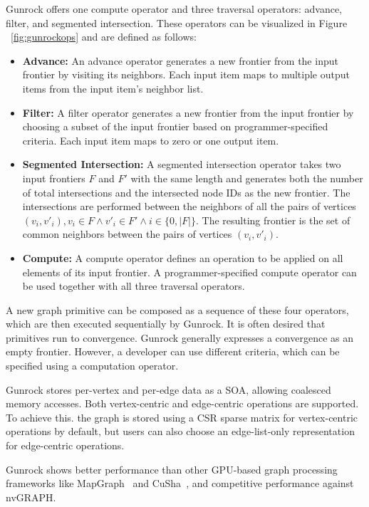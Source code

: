     Gunrock offers one compute operator and three traversal operators: advance, filter, and segmented intersection. These operators can be visualized in Figure ~\ref{fig:gunrockops} and are defined as follows:

    \begin{itemize}
        \item \textbf{Advance:} An advance operator generates a new frontier from the input frontier by visiting its neighbors. Each input item maps to multiple output items from the input item’s neighbor list.
        \item \textbf{Filter:} A filter operator generates a new frontier from the input frontier by choosing a subset of the input frontier based on programmer-specified criteria. Each input item maps to zero or one output item.
        \item \textbf{Segmented Intersection:} A segmented intersection operator takes two input frontiers $F$ and $F'$ with the same length and generates both the number of total intersections and the intersected node IDs as the new frontier. The intersections are performed between the neighbors of all the pairs of vertices $(v_i, v'_i), v_i \in F \land v'_i \in F' \land i \in \{0, |F|\}$. The resulting frontier is the set of common neighbors between the pairs of vertices $(v_i, v'_i)$.
        \item \textbf{Compute:} A compute operator defines an operation to be applied on all elements of its input frontier. A programmer-specified compute operator can be used together with all three traversal operators.
    \end{itemize}
    
    A new graph primitive can be composed as a sequence of these four operators, which are then executed sequentially by Gunrock. It is often desired that primitives run to convergence. Gunrock generally expresses a convergence as an empty frontier. However, a developer can use different criteria, which can be specified using a computation operator.

    Gunrock stores per-vertex and per-edge data as a \gls{SOA}, allowing coalesced memory accesses. Both vertex-centric and edge-centric operations are supported. To achieve this. the graph is stored using a \gls{CSR} sparse matrix for vertex-centric operations by default, but users can also choose an edge-list-only representation for edge-centric operations.

    Gunrock shows better performance than other \gls{GPU}-based graph processing frameworks like MapGraph~\cite{paper:mapgraph} and CuSha~\cite{paper:cusha}, and competitive performance against nvGRAPH.

